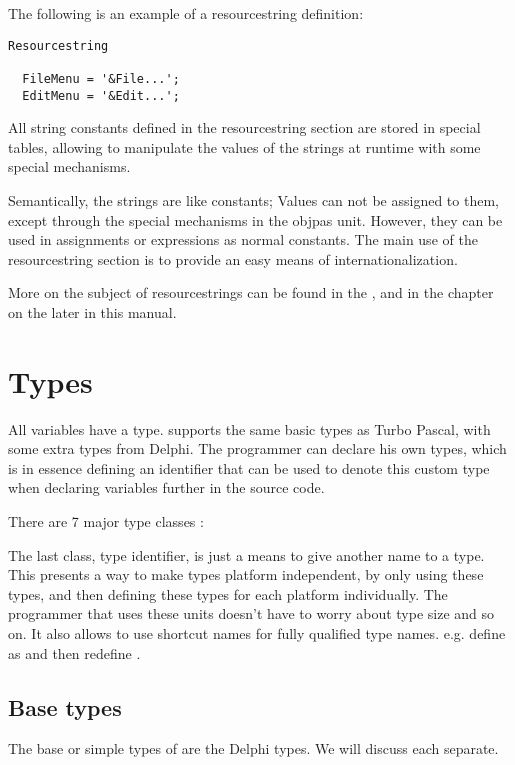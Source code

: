 The following is an example of a resourcestring definition:
\begin{verbatim}
Resourcestring

  FileMenu = '&File...';
  EditMenu = '&Edit...';
\end{verbatim}
All string constants defined in the resourcestring section are stored
in special tables, allowing to manipulate the values of the strings
at runtime with some special mechanisms.

Semantically, the strings are like constants; Values can not be assigned  to
them, except through the special mechanisms in the objpas unit. However,
they can be used in assignments or expressions as normal constants.
The main use of the resourcestring section is to provide an easy means
of internationalization.

More on the subject of resourcestrings can be found in the \progref, and
in the chapter on the  later in this manual.

\chapter{Types}
All variables have a type. \fpc supports the same basic types as Turbo
Pascal, with some extra types from Delphi.
The programmer can declare his own types, which is in essence defining an identifier
that can be used to denote this custom type when declaring variables further
in the source code.

There are 7 major type classes :

The last class, {\sffamily type identifier}, is just a means to give another
name to a type. This presents a way to make types platform independent, by
only using these types, and then defining these types for each platform
individually. The programmer that uses these units doesn't have to worry
about type size and so on. It also allows to use shortcut names for
fully qualified type names. e.g. define  as
 and then redefine .

\section{Base types}
The base or simple types of \fpc are the Delphi types.
We will discuss each separate.

